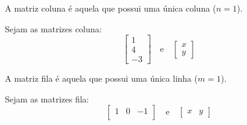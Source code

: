 \begin{df}
	A matriz coluna é aquela que possui uma única coluna ($n=1$).
\end{df}

\begin{ex}
	Sejam as matrizes coluna:\\
	\begin{equation*}
	\begin{bmatrix}
	1 \\
	4 \\
	-3
	\end{bmatrix} \quad \text{e} \quad\begin{bmatrix}
	x\\
	y 
	\end{bmatrix}
	\end{equation*}
\end{ex}

\begin{df}
	A matriz fila é aquela que possui uma única linha ($m=1$).
\end{df}
\begin{ex}
	Sejam as matrizes fila:\\
	\begin{equation*}
	\begin{bmatrix}
	1 & 0 &-1\\	\end{bmatrix}\quad \text{e}\quad \begin{bmatrix}
	x & y
	\end{bmatrix}
	\end{equation*}
\end{ex}

